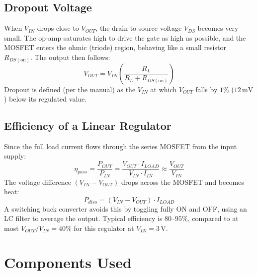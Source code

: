 \documentclass[11pt,a4paper]{article}
\begin{document}
\subsection{Dropout Voltage}
When $V_{IN}$ drops close to $V_{OUT}$, the drain-to-source voltage $V_{DS}$ becomes very small. The op-amp saturates high to drive the gate as high as possible, and the MOSFET enters the ohmic (triode) region, behaving like a small resistor $R_{DS(\text{on})}$. The output then follows:
\begin{equation}
    V_{OUT} = V_{IN} \left( \frac{R_L}{R_L + R_{DS(\text{on})}} \right)
\end{equation}
Dropout is defined (per the manual) as the $V_{IN}$ at which $V_{OUT}$ falls by $1\%$ ($12\,\text{mV}$) below its regulated value.

\subsection{Efficiency of a Linear Regulator}
Since the full load current flows through the series MOSFET from the input supply:
\begin{equation}
    \eta_{pass} = \frac{P_{OUT}}{P_{IN}} = \frac{V_{OUT} \cdot I_{LOAD}}{V_{IN} \cdot I_{IN}} \approx \frac{V_{OUT}}{V_{IN}}
\end{equation}
The voltage difference $(V_{IN} - V_{OUT})$ drops across the MOSFET and becomes heat:
\begin{equation}
    P_{diss} = (V_{IN} - V_{OUT}) \cdot I_{LOAD}
\end{equation}
A switching buck converter avoids this by toggling fully ON and OFF, using an LC filter to average the output. Typical efficiency is $80\text{--}95\%$, compared to at most $V_{OUT}/V_{IN} = 40\%$ for this regulator at $V_{IN} = 3\,\text{V}$.

\section{Components Used}
\end{document}
